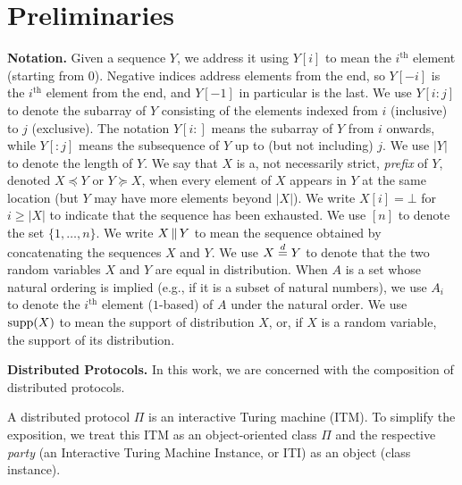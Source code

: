 \section{Preliminaries}

\noindent
\textbf{Notation.}
Given a sequence $Y$, we address it using $Y[i]$ to mean the $i^\text{th}$ element (starting from $0$).
Negative indices address elements from the end, so $Y[-i]$ is the $i^\text{th}$ element from
the end, and $Y[-1]$ in particular is the last. We use $Y[i{:}j]$ to denote the subarray of $Y$
consisting of the elements indexed from $i$ (inclusive) to $j$ (exclusive). The notation $Y[i{:}]$ means the
subarray of $Y$ from $i$ onwards, while $Y[{:}j]$ means the subsequence of $Y$ up to (but not including) $j$.
We use $|Y|$ to denote the length of $Y$.
We say that $X$ is a, not necessarily strict,
\emph{prefix} of $Y$, denoted $X \preceq Y$
or $Y \succeq X$,
when every element of $X$ appears in $Y$ at the
same location (but $Y$ may have more elements beyond $|X|$).
We write $X[i] = \bot$ for $i \geq |X|$ to indicate that the sequence
has been exhausted.
We use $[n]$ to denote the set $\{1, \ldots, n\}$.
We write $X \,\|\, Y$ to mean the sequence obtained by concatenating
the sequences $X$ and $Y$.
We use $X \distreq Y$ to denote that the two random variables $X$ and $Y$
are equal in distribution.
When $A$ is a set whose natural ordering is implied (e.g., if it is a subset
of natural numbers), we use $A_i$ to denote the $i^\text{th}$ element ($1$-based)
of $A$ under the natural order.
We use $\operatorname{supp}(X)$ to mean the support of distribution $X$,
or, if $X$ is a random variable, the support of its distribution.

\noindent
\textbf{Distributed Protocols.}
In this work, we are concerned with the composition of distributed
protocols.

A distributed protocol $\Pi$ is an interactive Turing machine (ITM).
To simplify the exposition, we treat this ITM
as an object-oriented class $\Pi$ and the respective \emph{party}
(an Interactive Turing Machine Instance, or ITI) as an object (class instance).

